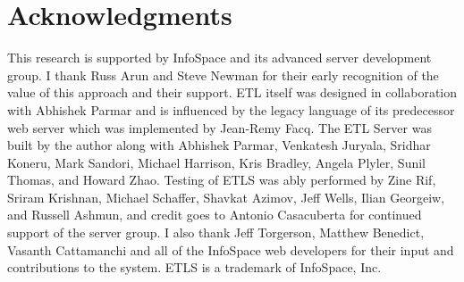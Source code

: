 \documentclass{www2003-submission}
\begin{document}
\section{Acknowledgments}
\label{sec-ack}
This research is supported by InfoSpace and its advanced server
development group.  I thank Russ Arun and Steve Newman for their early
recognition of the value of this approach and their support.  ETL
itself was designed in collaboration with Abhishek Parmar and is
influenced by the legacy language of its predecessor web server which
was implemented by Jean-Remy Facq.  The ETL Server was built by the
author along with Abhishek Parmar, Venkatesh Juryala, Sridhar Koneru,
Mark Sandori, Michael Harrison, Kris Bradley, Angela Plyler, Sunil
Thomas, and Howard Zhao.  Testing of ETLS was ably performed by Zine
Rif, Sriram Krishnan, Michael Schaffer, Shavkat Azimov, Jeff Wells,
Ilian Georgeiw, and Russell Ashmun, and credit goes to Antonio
Casacuberta for continued support of the server group.  I also thank
Jeff Torgerson, Matthew Benedict, Vasanth Cattamanchi and all of the
InfoSpace web developers for their input and contributions to
the system. ETLS is a trademark of InfoSpace, Inc.




%
\end{document}
